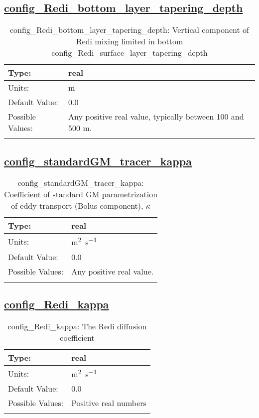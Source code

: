 \subsection[config\_Redi\_bottom\_layer\_tapering\_depth]{\hyperref[sec:nm_tab_mesoscale_eddy_parameterization]{config\_Redi\_bottom\_layer\_tapering\_depth}}
\label{subsec:nm_sec_config_Redi_bottom_layer_tapering_depth}
\begin{center}
\begin{longtable}{| p{2.0in} || p{4.0in} |}
    \hline
    Type: & real \\
    \hline
    Units: & \si{m} \\
    \hline
    Default Value: & 0.0 \\
    \hline
    Possible Values: & Any positive real value, typically between 100 and 500 m. \\
    \hline
    \caption{config\_Redi\_bottom\_layer\_tapering\_depth: Vertical component of Redi mixing limited in bottom config\_Redi\_surface\_layer\_tapering\_depth}
\end{longtable}
\end{center}
\subsection[config\_standardGM\_tracer\_kappa]{\hyperref[sec:nm_tab_mesoscale_eddy_parameterization]{config\_standardGM\_tracer\_kappa}}
\label{subsec:nm_sec_config_standardGM_tracer_kappa}
\begin{center}
\begin{longtable}{| p{2.0in} || p{4.0in} |}
    \hline
    Type: & real \\
    \hline
    Units: & \si{m^2.s^{-1}} \\
    \hline
    Default Value: & 0.0 \\
    \hline
    Possible Values: & Any positive real value. \\
    \hline
    \caption{config\_standardGM\_tracer\_kappa: Coefficient of standard GM parametrization of eddy transport (Bolus component), $\kappa$}
\end{longtable}
\end{center}
\subsection[config\_Redi\_kappa]{\hyperref[sec:nm_tab_mesoscale_eddy_parameterization]{config\_Redi\_kappa}}
\label{subsec:nm_sec_config_Redi_kappa}
\begin{center}
\begin{longtable}{| p{2.0in} || p{4.0in} |}
    \hline
    Type: & real \\
    \hline
    Units: & \si{m^2.s^{-1}} \\
    \hline
    Default Value: & 0.0 \\
    \hline
    Possible Values: & Positive real numbers \\
    \hline
    \caption{config\_Redi\_kappa: The Redi diffusion coefficient}
\end{longtable}
\end{center}
